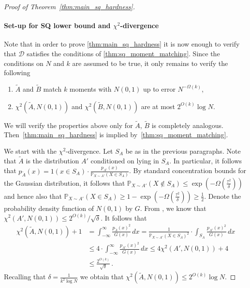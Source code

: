\documentclass{theoretics}
\newcommand{\Paren}[1]{\left(#1\right)}
\newcommand{\Psymb}{\mathbb{P}}
\newcommand{\cD}{\mathcal D}
\renewcommand{\leq}{\leqslant}
\renewcommand{\geq}{\geqslant}
\begin{document}
\begin{proof}[Proof of Theorem~\ref{thm:main_sq_hardness}]
    \paragraph{Set-up for SQ lower bound and $\chi^2$-divergence}
    Note that in order to prove \cref{thm:main_sq_hardness} it is now enough to verify that $\cD$ satisfies the conditions of \cref{thm:sq_moment_matching}.
    Since the conditions on $N$ and $k$ are assumed to be true, it only remains to verify the following
    \begin{enumerate}
        \item $\tilde{A}$ and $\tilde{B}$ match $k$ moments with $N(0,1)$ up to error $N^{-\Omega(k)}$,
        \item $\chi^2({\tilde{A},N(0,1)})$ and $\chi^2({\tilde{B},N(0,1)})$ are at most $2^{O(k)} \log N$.
    \end{enumerate}
    We will verify the properties above only for $\tilde{A}$, $\tilde{B}$ is completely analogous.
    Then~\cref{thm:main_sq_hardness} is implied by~\cref{thm:sq_moment_matching}.

    We start with the $\chi^2$-divergence.
    Let $S_A$ be as in the previous paragraphs.
    Note that $\tilde{A}$ is the distribution $A'$ conditioned on lying in $S_A$.
    In particular, it follows that $p_{\tilde{A}}(x) = 1\Paren{x \in S_A} \cdot \tfrac {p_{A'}(x)}{\Psymb_{X \sim A'}(X \in S_A)}$.
    By standard concentration bounds for the Gaussian distribution, it follows that $\Psymb_{X \sim A'}(X \not\in S_A) \leq \exp(-\Omega(\tfrac {\tau^2} \delta))$ and hence also that $\Psymb_{X \sim A'}(X \in S_A) \geq 1 -\exp(-\Omega(\tfrac {\tau^2} \delta)) \geq \tfrac 1 2$.
    Denote the probability density function of $N(0,1)$ by $G$.
    From \cite[Lemma 4.6]{DKS17}, we know that $\chi^2(A',N(0,1)) \leq 2^{O(k)}/\sqrt{\delta}$.
    It follows that
    \begin{align*}
        \chi^2(\tilde{A},N(0,1)) + 1 &= \int_{-\infty}^\infty \frac{p_{\tilde{A}}(x)^2}{G(x)} \,dx = \frac 1 {\Psymb_{X \sim A'}\Paren{X \in S_A}^2} \cdot \int_{S_A}\frac{p_{A'}(x)^2}{G(x)} \,dx \\
        &\leq 4 \cdot \int_{-\infty}^\infty \frac{p_{A'}(x)^2}{G(x)} \,dx \leq 4 \chi^2\Paren{A', N(0,1)} + 4 \\
        &\leq \frac{2^{O(k)}}{\sqrt{\delta}} \,.
    \end{align*}
    Recalling that $\delta = \tfrac 1 {k^2 \log N}$ we obtain that $\chi^2(\tilde{A},N(0,1))  \leq 2^{O(k)} \log N$.


\end{proof}
\end{document}

